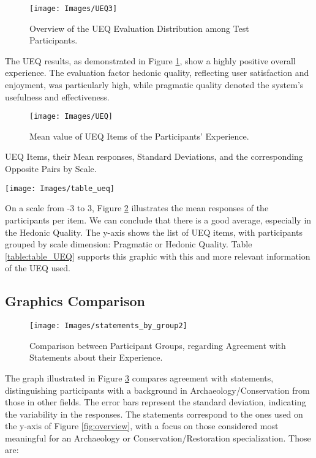 \begin{figure}[h!]
    \centering
    \texttt{[image: Images/UEQ3]}
    \caption{Overview of the \gls{UEQ} Evaluation Distribution among Test Participants.} 
    \label{fig:UEQ2}
\end{figure}


The \gls{UEQ} results, as demonstrated in Figure \ref{fig:UEQ2}, show a highly positive overall experience. 
The evaluation factor hedonic quality, reflecting user satisfaction and enjoyment, was particularly high, while pragmatic quality denoted the system’s usefulness and effectiveness.
\begin{figure}[h!]
    \centering
    \texttt{[image: Images/UEQ]}
    \caption{Mean value of \gls{UEQ} Items of the Participants' Experience.} 
    \label{fig:UEQ1}
\end{figure}
\begin{table}[h!]
    \caption{\gls{UEQ} Items, their Mean responses, Standard Deviations, and the corresponding Opposite Pairs by Scale.}
    \centering
    \texttt{[image: Images/table\_ueq]}
    \label{table:table_UEQ}
\end{table}


On a scale from -3 to 3, Figure \ref{fig:UEQ1} illustrates the mean responses of the participants per item.  
We can conclude that there is a good average, especially in the Hedonic Quality.  
The y-axis shows the list of \gls{UEQ} items, with participants grouped by scale dimension: Pragmatic or Hedonic Quality.  
Table \ref{table:table_UEQ} supports this graphic with this and more relevant information of the \gls{UEQ} used.
\FloatBarrier

\subsection{Graphics Comparison}
\label{sec:comparison}

\begin{figure}[h!]
    \centering
    \texttt{[image: Images/statements\_by\_group2]}
    \caption{Comparison between Participant Groups, regarding Agreement with Statements about their Experience.} 
    \label{fig:statements_background}
\end{figure}

The graph illustrated in Figure \ref{fig:statements_background} compares agreement with statements, distinguishing participants with a background in Archaeology/Conservation from those in other fields. The error bars represent the standard deviation, indicating the variability in the responses.
The statements correspond to the ones used on the y-axis of Figure \ref{fig:overview}, with a focus on those considered most meaningful for an Archaeology or Conservation/Restoration specialization.
Those are: 

